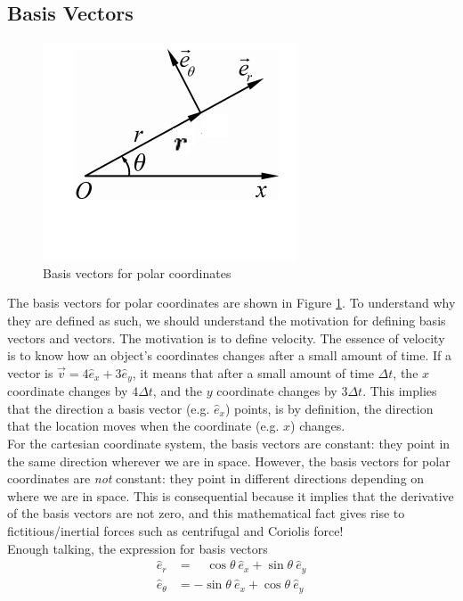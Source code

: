 \documentclass{article}
\begin{document}
\subsection{Basis Vectors}
\begin{figure}
\includegraphics[width=0.9\linewidth]{images/polarbasis.png}
\caption{Basis vectors for polar coordinates}
\label{fig:polarbasis}
\end{figure}
The basis vectors for polar coordinates are shown in Figure \ref{fig:polarbasis}. To understand why they are defined as such, we should understand the motivation for defining basis vectors and vectors. The motivation is to define velocity. The essence of velocity is to know how an object's coordinates changes after a small amount of time. If a vector is $\vec{v} = 4\hat{e}_x + 3 \hat{e}_y$, it means that after a small amount of time $\Delta t$, the $x$ coordinate changes by $4 \Delta t$, and the $y$ coordinate changes by $3 \Delta t$. This implies that the direction a basis vector (e.g. $\hat{e}_x$) points, is by definition, the direction that the location moves when the coordinate (e.g. $x$) changes.\\[10pt]
For the cartesian coordinate system, the basis vectors are constant: they point in the same direction wherever we are in space. However, the basis vectors for polar coordinates are \textit{not} constant: they point in different directions depending on where we are in space. This is consequential because it implies that the derivative of the basis vectors are not zero, and this mathematical fact gives rise to fictitious/inertial forces such as centrifugal and Coriolis force!\\[10pt]
Enough talking, the expression for basis vectors 
\begin{align}
    \hat{e}_r &=\quad \cos\theta\ \hat{e}_x + \sin\theta\ \hat{e}_y \\
    \hat{e}_\theta &= -\sin\theta\ \hat{e}_x + \cos\theta\ \hat{e}_y
\end{align}
\end{document}
